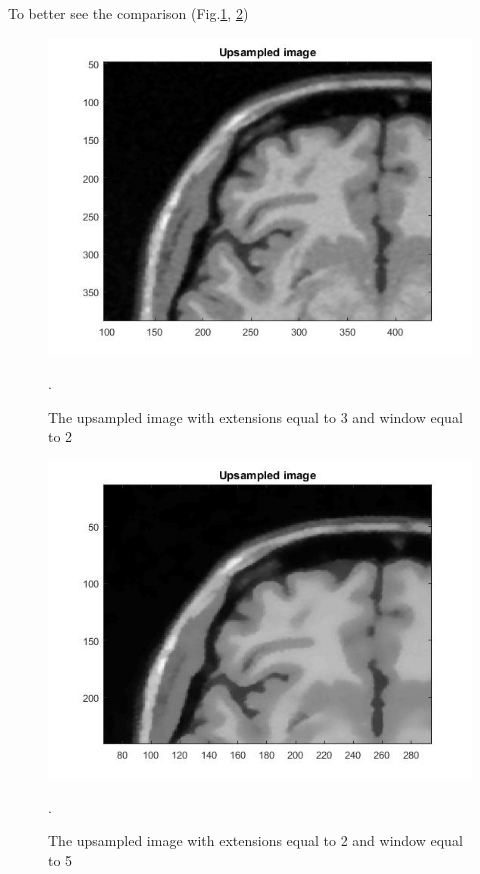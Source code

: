 \begin{enumerate}
To better see the comparison (Fig.\ref{fig: Module10_6_b}, \ref{fig: Module10_7_b})

\begin{figure}[H]
\centering{}\includegraphics[scale=0.4]{figures/Module_10/Module10_6_b}\caption{The upsampled image with extensions equal to 3 and window equal to 2}. 
\label{fig: Module10_6_b}
\end{figure}

\begin{figure}[H]
\centering{}\includegraphics[scale=0.4]{figures/Module_10/Module10_7_b}\caption{The upsampled image with extensions equal to 2 and window equal to 5}. 
\label{fig: Module10_7_b}
\end{figure}


\end{enumerate}
